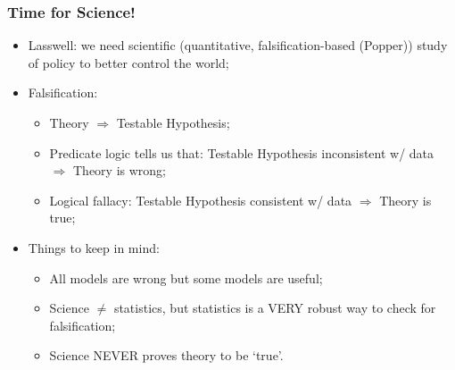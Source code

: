 \documentclass[aspectratio=169]{beamer}
\theoremstyle{principle}
\begin{document}
\begin{frame}
\frametitle{Time for Science!}

\begin{itemize}
\item Lasswell: we need scientific (quantitative, falsification-based (Popper)) study of policy to better control the world;
\bigskip
\bigskip
\item Falsification:
\begin{itemize}
\item Theory $\Longrightarrow$ Testable Hypothesis;
\item Predicate logic tells us that: Testable Hypothesis inconsistent w/ data $\Longrightarrow$ Theory is wrong;
\item Logical fallacy: Testable Hypothesis consistent w/ data $\Longrightarrow$ Theory is true;
\end{itemize}
\bigskip
\bigskip
\item Things to keep in mind:
\begin{itemize}
\item All models are wrong but some models are useful;
\item Science $\neq$ statistics, but statistics is a VERY robust way to check for falsification;
\item Science NEVER proves theory to be `true'.
\end{itemize}
\end{itemize}

\end{frame}

\end{document}
